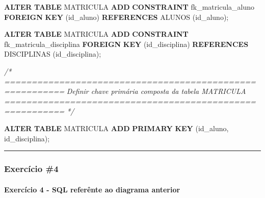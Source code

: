 \documentclass[
]{book}
\newenvironment{Shaded}{\begin{snugshade}}{\end{snugshade}}
\newcommand{\CommentTok}[1]{\textcolor[rgb]{0.56,0.35,0.01}{\textit{#1}}}
\newcommand{\KeywordTok}[1]{\textcolor[rgb]{0.13,0.29,0.53}{\textbf{#1}}}
\newcommand{\NormalTok}[1]{#1}
\begin{document}
\begin{Shaded}
\begin{Highlighting}[]
\KeywordTok{ALTER} \KeywordTok{TABLE}\NormalTok{ MATRICULA }\KeywordTok{ADD} \KeywordTok{CONSTRAINT}\NormalTok{ fk\_matricula\_aluno }\KeywordTok{FOREIGN} \KeywordTok{KEY}\NormalTok{ (id\_aluno) }\KeywordTok{REFERENCES}\NormalTok{ ALUNOS (id\_aluno);}

\KeywordTok{ALTER} \KeywordTok{TABLE}\NormalTok{ MATRICULA }\KeywordTok{ADD} \KeywordTok{CONSTRAINT}\NormalTok{ fk\_matricula\_disciplina }\KeywordTok{FOREIGN} \KeywordTok{KEY}\NormalTok{ (id\_disciplina) }\KeywordTok{REFERENCES}\NormalTok{ DISCIPLINAS (id\_disciplina);}

\CommentTok{/* =========================================================}
\CommentTok{   Definir chave primária composta da tabela MATRICULA}
\CommentTok{   ========================================================= */}

\KeywordTok{ALTER} \KeywordTok{TABLE}\NormalTok{ MATRICULA }\KeywordTok{ADD} \KeywordTok{PRIMARY} \KeywordTok{KEY}\NormalTok{ (id\_aluno, id\_disciplina);}
\end{Highlighting}
\end{Shaded}

\begin{center}\rule{0.5\linewidth}{0.5pt}\end{center}

\subsubsection{Exercício \#4}\label{exercuxedcio-4}



\paragraph{Exercício 4 - SQL referênte ao diagrama anterior}\label{exercuxedcio-4---sql-referuxeante-ao-diagrama-anterior}
\end{document}
